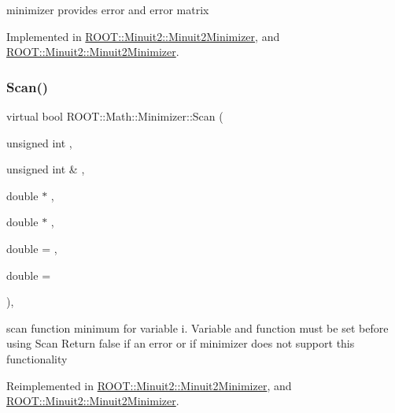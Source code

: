 minimizer provides error and error matrix 



Implemented in \mbox{\hyperlink{classROOT_1_1Minuit2_1_1Minuit2Minimizer_a3a3a8abea38285fe639f2f0ec5505533}{R\+O\+O\+T\+::\+Minuit2\+::\+Minuit2\+Minimizer}}, and \mbox{\hyperlink{classROOT_1_1Minuit2_1_1Minuit2Minimizer_a3a3a8abea38285fe639f2f0ec5505533}{R\+O\+O\+T\+::\+Minuit2\+::\+Minuit2\+Minimizer}}.

\mbox{\label{classROOT_1_1Math_1_1Minimizer_a1e6e4b32d7338a7a08791cff67f54080}} 
\subsubsection{\texorpdfstring{Scan()}{Scan()}\hspace{0.1cm}{\footnotesize\ttfamily [1/2]}}
{\footnotesize\ttfamily virtual bool R\+O\+O\+T\+::\+Math\+::\+Minimizer\+::\+Scan (\begin{DoxyParamCaption}\item[{unsigned int}]{,  }\item[{unsigned int \&}]{,  }\item[{double $\ast$}]{,  }\item[{double $\ast$}]{,  }\item[{double}]{ = {},  }\item[{double}]{ = {} }\end{DoxyParamCaption})\hspace{0.3cm}{\ttfamily [inline]}, {\ttfamily [virtual]}}

scan function minimum for variable i. Variable and function must be set before using Scan Return false if an error or if minimizer does not support this functionality 

Reimplemented in \mbox{\hyperlink{classROOT_1_1Minuit2_1_1Minuit2Minimizer_a3f2f94c743a9b120a71da5ba23bd88cb}{R\+O\+O\+T\+::\+Minuit2\+::\+Minuit2\+Minimizer}}, and \mbox{\hyperlink{classROOT_1_1Minuit2_1_1Minuit2Minimizer_a3f2f94c743a9b120a71da5ba23bd88cb}{R\+O\+O\+T\+::\+Minuit2\+::\+Minuit2\+Minimizer}}.

\mbox{\label{classROOT_1_1Math_1_1Minimizer_a1e6e4b32d7338a7a08791cff67f54080}} 
